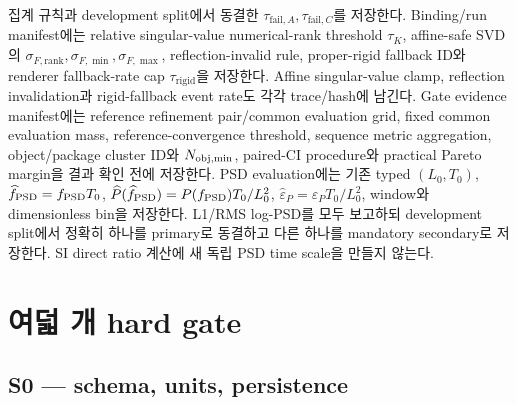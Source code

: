 \documentclass[10pt]{article}
\begin{document}
집계 규칙과
development split에서 동결한 \(\tau_{\mathrm{fail},A},\tau_{\mathrm{fail},C}\)를 저장한다.
Binding/run manifest에는 relative singular-value numerical-rank threshold \(\tau_K\),
affine-safe SVD의 \(\sigma_{F,\mathrm{rank}},\sigma_{F,\min},\sigma_{F,\max}\), reflection-invalid rule,
proper-rigid fallback ID와 renderer fallback-rate cap \(\tau_{\mathrm{rigid}}\)을 저장한다.
Affine singular-value clamp, reflection invalidation과 rigid-fallback event rate도 각각 trace/hash에 남긴다.
Gate evidence manifest에는 reference refinement pair/common evaluation grid,
fixed common evaluation mass, reference-convergence threshold, sequence metric aggregation,
object/package cluster ID와 \(N_{\rm obj,min}\),
paired-CI procedure와 practical Pareto margin을 결과 확인 전에 저장한다.
PSD evaluation에는 기존 typed \((L_0,T_0)\),
\(\widehat f_{\rm PSD}=f_{\rm PSD}T_0\),
\(\widehat P(\widehat f_{\rm PSD})=P(f_{\rm PSD})T_0/L_0^2\),
\(\widehat\varepsilon_P=\varepsilon_PT_0/L_0^2\), window와 dimensionless bin을 저장한다.
L1/RMS log-PSD를 모두 보고하되 development split에서 정확히 하나를 primary로 동결하고
다른 하나를 mandatory secondary로 저장한다. SI direct ratio 계산에 새 독립 PSD time scale을 만들지 않는다.

\section{여덟 개 hard gate}

\subsection{S0 --- schema, units, persistence}
\end{document}
